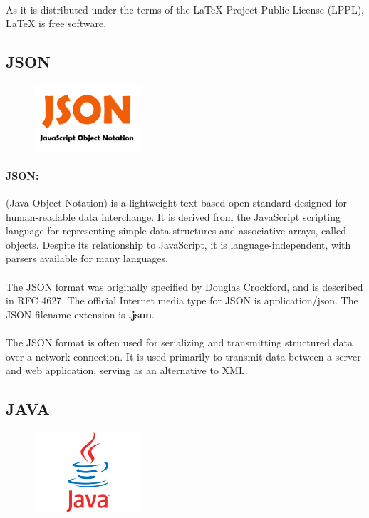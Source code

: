 \paragraph{}As it is distributed under the terms of the LaTeX Project Public License (LPPL), LaTeX is free software.\par
\subsection{JSON}
\begin{figure}
\includegraphics[width=4cm]{./images/implementation/json}
\end{figure}
\paragraph{JSON: }(Java Object Notation) is a lightweight text-based open standard designed for human-readable data interchange.
 It is derived from the JavaScript scripting language for representing simple data structures and associative arrays, 
called objects. Despite its relationship to JavaScript, it is language-independent, with parsers available for many languages.\par

\paragraph{}The JSON format was originally specified by Douglas Crockford, and is described in RFC 4627. 
The official Internet media type for JSON is application/json. The JSON filename extension is \textbf{.json}.
\paragraph{}The JSON format is often used for serializing and transmitting structured data over a network connection.
 It is used primarily to transmit data between a server and web application, serving as an alternative to XML.\par
\subsection{JAVA}
\begin{figure}
\includegraphics[width=4cm]{./images/implementation/java}
\end{figure}
